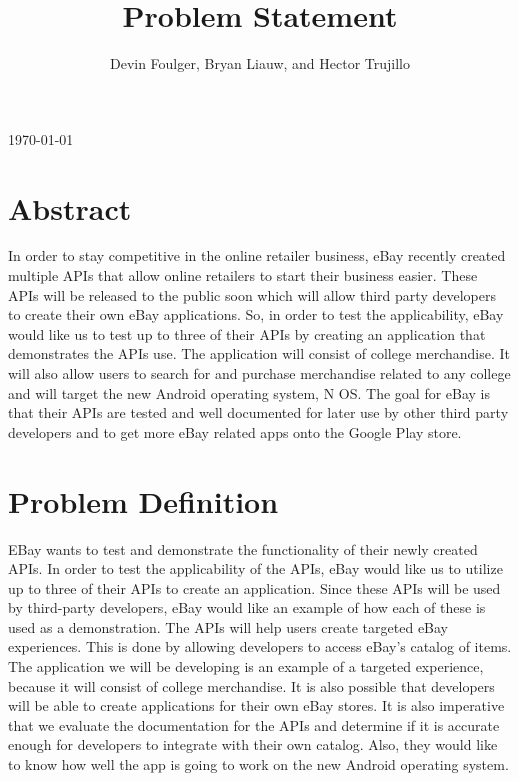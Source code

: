 \documentclass[letterpaper, 10pt, draftclsnofoot, onecolumn]{IEEEtran}
\def\name{Devin Foulger, Bryan Liauw, and Hector Trujillo }
\begin{document}
\title{ Problem Statement}
\author{\name\vspace{-10ex}}
\maketitle
\begin{center}
	\today\vspace{2ex}
\end{center}
\section*{Abstract}
	In order to stay competitive in the online retailer business, eBay recently 
	created multiple APIs that allow online retailers to start their business 
	easier. These APIs will be released to the public soon which will allow third 
	party developers to create their own eBay applications. So, in order to test 
	the applicability, eBay would like us to test up to three of their APIs by 
	creating an application that demonstrates the APIs use. The application will 
	consist of college merchandise. It will also allow users to search for and
	 purchase merchandise related to any college and will target the new Android 
	operating system, N OS. The goal for eBay is that their APIs are tested and 
	well documented for later use by other third party developers and to get more 
	eBay related apps onto the Google Play store.

\section*{Problem Definition}
	EBay wants to test and demonstrate the functionality of their newly created 
	APIs. In order to test the applicability of the APIs, eBay would like us to 
	utilize up to three of their APIs to create an application. Since these APIs 
	will be used by third-party developers, eBay would like an example of how each 
	of these is used as a demonstration. The APIs will help users create targeted 
	eBay experiences. This is done by allowing developers to access eBay's catalog 
	of items. The application we will be developing is an example of a targeted 
	experience, because it will consist of college merchandise. It is also possible
	 that developers will be able to create applications for their own eBay 
	stores. It is also imperative that we evaluate the documentation for the APIs 
	and determine if it is accurate enough for developers to integrate with their 
	own catalog. Also, they would like to know how well the app is going to work 
	on the new Android operating system. 
\end{document}
